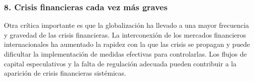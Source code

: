 \documentclass[
  a4paper,
]{article}
\begin{document}
\subsubsection{8. Crisis financieras cada vez más
graves}\label{crisis-financieras-cada-vez-muxe1s-graves}

Otra crítica importante es que la globalización ha llevado a una mayor
frecuencia y gravedad de las crisis financieras. La interconexión de los
mercados financieros internacionales ha aumentado la rapidez con la que
las crisis se propagan y puede dificultar la implementación de medidas
efectivas para controlarlas. Los flujos de capital especulativos y la
falta de regulación adecuada pueden contribuir a la aparición de crisis
financieras sistémicas.


\printbibliography
\end{document}
